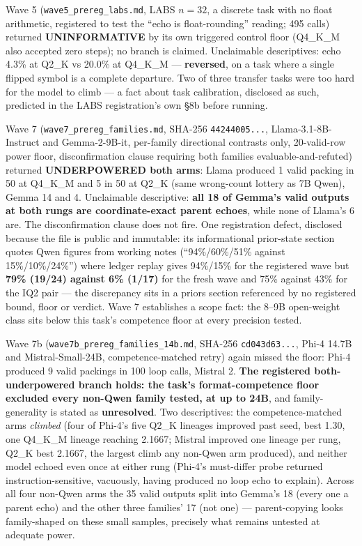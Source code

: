 Wave 5 (\texttt{wave5\_prereg\_labs.md}, LABS $n = 32$, a discrete task with no float arithmetic, registered to test the ``echo is float-rounding'' reading; 495 calls) returned \textbf{UNINFORMATIVE} by its own triggered control floor (Q4\_K\_M also accepted zero steps); no branch is claimed. Unclaimable descriptives: echo 4.3\% at Q2\_K vs 20.0\% at Q4\_K\_M --- \textbf{reversed}, on a task where a single flipped symbol is a complete departure. Two of three transfer tasks were too hard for the model to climb --- a fact about task calibration, disclosed as such, predicted in the LABS registration's own \S8b before running.

Wave 7 (\texttt{wave7\_prereg\_families.md}, SHA-256 \texttt{44244005...}, Llama-3.1-8B-Instruct and Gemma-2-9B-it, per-family directional contrasts only, 20-valid-row power floor, disconfirmation clause requiring both families evaluable-and-refuted) returned \textbf{UNDERPOWERED both arms}: Llama produced 1 valid packing in 50 at Q4\_K\_M and 5 in 50 at Q2\_K (same wrong-count lottery as 7B Qwen), Gemma 14 and 4. Unclaimable descriptive: \textbf{all 18 of Gemma's valid outputs at both rungs are coordinate-exact parent echoes}, while none of Llama's 6 are. The disconfirmation clause does not fire. One registration defect, disclosed because the file is public and immutable: its informational prior-state section quotes Qwen figures from working notes (``94\%/60\%/51\% against 15\%/10\%/24\%'') where ledger replay gives 94\%/15\% for the registered wave but \textbf{79\% (19/24) against 6\% (1/17)} for the fresh wave and 75\% against 43\% for the IQ2 pair --- the discrepancy sits in a priors section referenced by no registered bound, floor or verdict. Wave 7 establishes a scope fact: the 8--9B open-weight class sits below this task's competence floor at every precision tested.

Wave 7b (\texttt{wave7b\_prereg\_families\_14b.md}, SHA-256 \texttt{cd043d63...}, Phi-4 14.7B and Mistral-Small-24B, competence-matched retry) again missed the floor: Phi-4 produced 9 valid packings in 100 loop calls, Mistral 2. \textbf{The registered both-underpowered branch holds: the task's format-competence floor excluded every non-Qwen family tested, at up to 24B}, and family-generality is stated as \textbf{unresolved}. Two descriptives: the competence-matched arms \emph{climbed} (four of Phi-4's five Q2\_K lineages improved past seed, best 1.30, one Q4\_K\_M lineage reaching 2.1667; Mistral improved one lineage per rung, Q2\_K best 2.1667, the largest climb any non-Qwen arm produced), and neither model echoed even once at either rung (Phi-4's must-differ probe returned instruction-sensitive, vacuously, having produced no loop echo to explain). Across all four non-Qwen arms the 35 valid outputs split into Gemma's 18 (every one a parent echo) and the other three families' 17 (not one) --- parent-copying looks family-shaped on these small samples, precisely what remains untested at adequate power.

